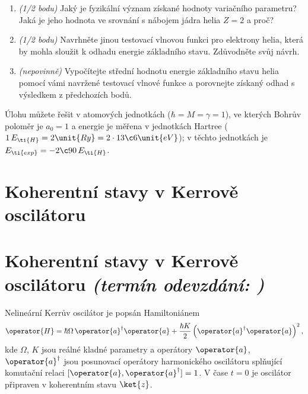 \documentclass[a4paper,11pt,twoside]{book}
\def\np{\newpage}
\newcommand{\exercise}[2][]{\ifthenelse{\isempty{#1}}
	{\np\section{#2}}
	{\np\section[#2]{{#2} \small{\it{(termín odevzdání: {#1})}}}}
}
\begin{document}
\begin{enumerate}
    \item \emph{(1/2 bodu)}
        Jaký je fyzikální význam získané hodnoty variačního parametru? Jaká je jeho hodnota ve srovnání s nábojem jádra helia $Z=2$ a proč?

    \item \emph{(1/2 bodu)}
        Navrhněte jinou testovací vlnovou funkci pro elektrony helia, která by mohla sloužit k odhadu energie základního stavu.
        Zdůvodněte svůj návrh.

    \item \emph{(nepovinně)}
        Vypočítejte střední hodnotu energie základního stavu helia pomocí vámi navržené testovací vlnové funkce a porovnejte získaný odhad s výsledkem z předchozích bodů.

    \end{enumerate}

\note
    Úlohu můžete řešit v atomových jednotkách ($\hbar=M=\gamma=1$), ve kterých Bohrův poloměr je $a_{0}=1$ a energie je měřena v jednotkách Hartree ($1\,E_\ti{H}=2\unit{Ry}=2\cdot13\c6\unit{eV}$); v těchto jednotkách je $E_{\ti{exp}}=-2\c90\,E_\ti{H}$.
    
\exercise{Koherentní stavy v Kerrově oscilátoru}
\setcounter{footnote}{0}
    Nelineární Kerrův oscilátor je popsán Hamiltoniánem
    \begin{equation*}
        \operator{H}
            =\hbar\Omega\,\operator{a}^{\dagger}\operator{a}+\frac{\hbar K}{2}\left(\operator{a}^{\dagger}\operator{a}\right)^{2},
    \end{equation*}
    kde $\Omega$, $K$ jsou reálné kladné parametry a operátory $\operator{a}$, $\operator{a}^{\dagger}$ jsou posunovací operátory harmonického oscilátoru splňující komutační relaci $[\operator{a},\operator{a}^{\dagger}]=1$.
    V čase $t=0$ je oscilátor připraven v koherentním stavu $\ket{z}$.
\end{document}

